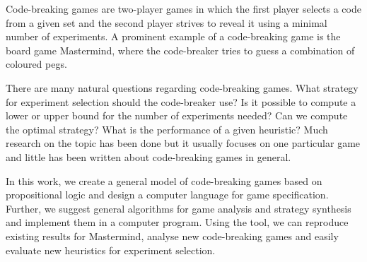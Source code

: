 \begin{ThesisAbstract}
Code-breaking games are two-player games in which the first player selects
  a code from a given set and the second player strives to reveal it using a
  minimal number of experiments.
A prominent example of a code-breaking game is the board game Mastermind,
  where the code-breaker tries to guess a combination of coloured pegs.

There are many natural questions regarding code-breaking games.
What strategy for experiment selection should the code-breaker use?
Is it possible to compute a lower or upper bound for the number of experiments needed?
Can we compute the optimal strategy?
What is the performance of a given heuristic?
Much research on the topic has been done but it usually focuses
  on one particular game and little has been written about code-breaking
  games in general.

In this work, we create a general model of code-breaking games
  based on propositional logic
  and design a computer language for game specification.
Further, we suggest general algorithms for game analysis and strategy synthesis
  and implement them in a computer program.
Using the tool, we can reproduce existing results for Mastermind,
  analyse new code-breaking games and easily evaluate new heuristics
  for experiment selection.
\end{ThesisAbstract}

\MainMatter
\setlength{\parindent}{0pt}

\setcounter{secnumdepth}{1}
\setcounter{tocdepth}{2}
\begin{spacing}{1.2} \normalsize
\tableofcontents
\end{spacing}










\pagestyle{plain}
\printbibliography
\clearpage
{}


{}

% 


